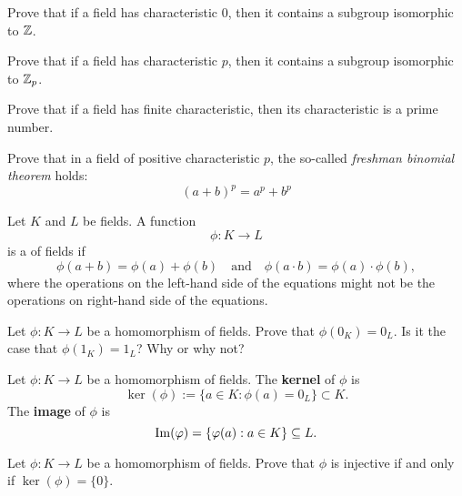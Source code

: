 \documentclass{ximera}
\begin{document}
\begin{exercise}
  Prove that if a field has characteristic $0$, then it contains a
  subgroup isomorphic to $\mathbb Z$.
\end{exercise}

\begin{exercise}
  Prove that if a field has characteristic $p$, then it contains a
  subgroup isomorphic to $\mathbb Z_p$.
\end{exercise}



\begin{exercise} 
Prove that if a field has finite characteristic, then its
characteristic is a prime number.
\end{exercise}

\begin{exercise}\label{E:FBT}
Prove that in a field of positive characteristic $p$, the so-called
\textit{freshman binomial theorem} holds:
\[
(a+b)^p = a^p + b^p
\]
\end{exercise}





\begin{definition}
  Let $K$ and $L$ be fields. A function
  \[
  \phi:K\to L
  \]
  is a  of fields if
  \[
  \phi(a+b) = \phi(a)+\phi(b)\quad\text{and}\quad\phi(a\cdot b) = \phi(a)\cdot \phi(b),
  \]
  where the operations on the left-hand side of the equations might not
  be the operations on right-hand side of the equations. 
\end{definition}

\begin{exercise}
  Let $\phi:K\to L$ be a homomorphism of fields. Prove that $\phi(0_K)
  = 0_L$. Is it the case that $\phi(1_K) = 1_L$? Why or why not?
\end{exercise}


\begin{definition}
  Let $\phi: K\to L$ be a homomorphism of fields. The \textbf{kernel}
  of $\phi$ is
  \[
  \ker(\phi) := \{a\in K:\phi(a) = 0_L\}\subset K.
  \]
  The \textbf{image} of $\phi$ is
  \[
  \operatorname{Im}(\varphi) = \{\varphi(a):a\in K\}\subseteq L.
  \]
\end{definition}


\begin{exercise}
  Let $\phi:K\to L$ be a homomorphism of fields. Prove that $\phi$ is
  injective if and only if $\ker(\phi) = \{0\}$.
\end{exercise}
\end{document}
